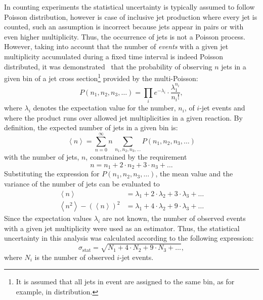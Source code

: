 In counting experiments the statistical uncertainty is typically assumed to follow Poisson distribution, however is case of inclusive jet production where every jet is counted, such an assumption is incorrect because jets appear in pairs or with even higher multiplicity. Thus, the occurrence of jets is not a Poisson process. However, taking into account that the number of \textit{events} with a given jet multiplicity accumulated during a fixed time interval is indeed Poisson distributed, it was demonstrated~\cite{upub:juanstatcorrel} that the probability of observing $n$ jets in a given bin of a jet cross section\footnote{It is assumed that all jets in event are assigned to the same bin, as for example, in \qsq distribution.} provided by the multi-Poisson:
\begin{equation}
P\left(n_1, n_2, n_3, \ldots \right) = \prod_i{ e^{-\lambda_i} \cdot \frac{\lambda_1^{n_i}}{n_i!} },
\label{eq:multipoissonqsq}
\end{equation}
where $\lambda_i$ denotes the expectation value for the number, $n_i$, of $i$-jet events and where the product runs over allowed jet multiplicities in a given reaction. By definition, the expected number of jets in a given bin is:
\begin{equation}
 \left\langle n \right \rangle = \sum_{n=0}^{\infty}{n\,\sum_{n_1,n_2,n_3,\ldots}{P\left(n_1,n_2,n_3,\ldots\right)}}
\end{equation}
with the number of jets, $n$, constrained by the requirement 
\begin{equation}
n = n_1 + 2\cdot n_2 + 3\cdot n_3 + \ldots
\end{equation}
Substituting the expression for $P\left(n_1, n_2, n_3, \ldots \right)$, the mean value and the variance of the number of jets can be evaluated to
\begin{align}
  \left\langle n \right \rangle &= \lambda_1 + 2\cdot\lambda_2 + 3\cdot\lambda_3 + \ldots\\
	\left\langle n^2 \right \rangle - \left( \left\langle n \right \rangle \right)^2 &= \lambda_1 + 4\cdot\lambda_2 + 9\cdot\lambda_3 +\ldots
\end{align}
Since the expectation values $\lambda_i$ are not known, the number of observed events with a given jet multiplicity were used as an estimator. Thus, the statistical uncertainty in this analysis was calculated according to the following expression:
\begin{equation}
\sigma_\text{stat} = \sqrt{N_1+4\cdot N_2 + 9\cdot N_3 + \ldots},
\end{equation}
where $N_i$ is the number of observed $i$-jet events.

